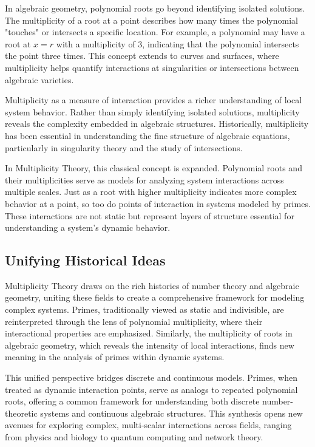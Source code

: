 \documentclass[12pt]{article}
\begin{document}
In algebraic geometry, polynomial roots go beyond identifying isolated solutions. The multiplicity of a root at a point describes how many times the polynomial "touches" or intersects a specific location. For example, a polynomial may have a root at \( x = r \) with a multiplicity of 3, indicating that the polynomial intersects the point three times. This concept extends to curves and surfaces, where multiplicity helps quantify interactions at singularities or intersections between algebraic varieties.

Multiplicity as a measure of interaction provides a richer understanding of local system behavior. Rather than simply identifying isolated solutions, multiplicity reveals the complexity embedded in algebraic structures. Historically, multiplicity has been essential in understanding the fine structure of algebraic equations, particularly in singularity theory and the study of intersections.

In Multiplicity Theory, this classical concept is expanded. Polynomial roots and their multiplicities serve as models for analyzing system interactions across multiple scales. Just as a root with higher multiplicity indicates more complex behavior at a point, so too do points of interaction in systems modeled by primes. These interactions are not static but represent layers of structure essential for understanding a system's dynamic behavior.

\subsection{Unifying Historical Ideas}

Multiplicity Theory draws on the rich histories of number theory and algebraic geometry, uniting these fields to create a comprehensive framework for modeling complex systems. Primes, traditionally viewed as static and indivisible, are reinterpreted through the lens of polynomial multiplicity, where their interactional properties are emphasized. Similarly, the multiplicity of roots in algebraic geometry, which reveals the intensity of local interactions, finds new meaning in the analysis of primes within dynamic systems.

This unified perspective bridges discrete and continuous models. Primes, when treated as dynamic interaction points, serve as analogs to repeated polynomial roots, offering a common framework for understanding both discrete number-theoretic systems and continuous algebraic structures. This synthesis opens new avenues for exploring complex, multi-scalar interactions across fields, ranging from physics and biology to quantum computing and network theory.
\end{document}

